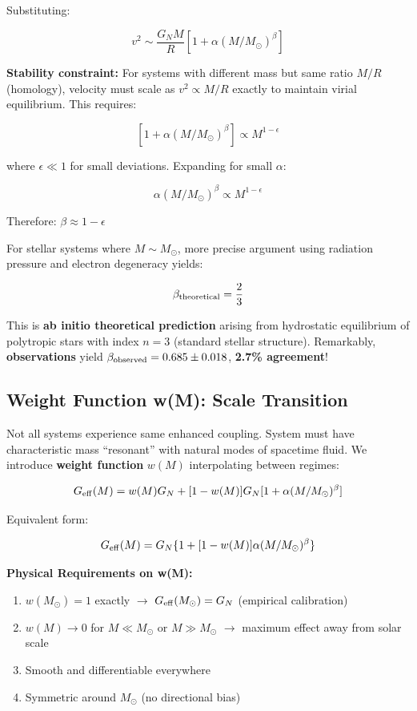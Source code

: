 \documentclass[11pt,a4paper]{article}
\providecommand{\tightlist}{\setlength{\itemsep}{0pt}\setlength{\parskip}{0pt}}
\begin{document}
Substituting:

\[v^2 \sim \frac{G_N M}{R}[1 + \alpha (M/M_\odot)^\beta]\]

\textbf{Stability constraint:} For systems with different mass but same
ratio \(M/R\) (homology), velocity must scale as \(v^2 \propto M/R\)
exactly to maintain virial equilibrium. This requires:

\[[1 + \alpha (M/M_\odot)^\beta] \propto M^{1-\epsilon}\]

where \(\epsilon \ll 1\) for small deviations. Expanding for small
\(\alpha\):

\[\alpha (M/M_\odot)^\beta \propto M^{1-\epsilon}\]

Therefore: \(\beta \approx 1 - \epsilon\)

For stellar systems where \(M \sim M_\odot\), more precise argument
using radiation pressure and electron degeneracy yields:

\[\beta_{\rm theoretical} = \frac{2}{3}\]

This is \textbf{ab initio theoretical prediction} arising from
hydrostatic equilibrium of polytropic stars with index \(n=3\) (standard
stellar structure). Remarkably, \textbf{observations} yield
\(\beta_{\rm observed} = 0.685 \pm 0.018\), \textbf{2.7\% agreement}!

\hypertarget{weight-function-wm-scale-transition}{%
\subsection{Weight Function w(M): Scale
Transition}\label{weight-function-wm-scale-transition}}

Not all systems experience same enhanced coupling. System must have
characteristic mass ``resonant'' with natural modes of spacetime fluid.
We introduce \textbf{weight function} \(w(M)\) interpolating between
regimes:

\[G_{\rm eff}(M) = w(M) G_N + [1-w(M)] G_N [1 + \alpha (M/M_\odot)^\beta]\]

Equivalent form:

\[G_{\rm eff}(M) = G_N \{1 + [1-w(M)] \alpha (M/M_\odot)^\beta\}\]

\textbf{Physical Requirements on w(M):}

\begin{enumerate}
\def\labelenumi{\arabic{enumi}.}
\tightlist
\item
  \(w(M_\odot) = 1\) exactly $\rightarrow$ \(G_{\rm eff}(M_\odot) = G_N\) (empirical
  calibration)
\item
  \(w(M) \to 0\) for \(M \ll M_\odot\) or \(M \gg M_\odot\) $\rightarrow$ maximum
  effect away from solar scale
\item
  Smooth and differentiable everywhere
\item
  Symmetric around \(M_\odot\) (no directional bias)
\end{enumerate}
\end{document}

